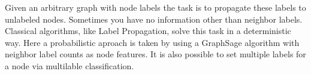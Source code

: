 Given an arbitrary graph with node labels the task is to propagate these labels to unlabeled nodes. Sometimes you have no information other than neighbor labels. Classical algorithms, like Label Propagation, solve this task in a deterministic way. Here a probabilistic aproach is taken by using a Graph\+Sage algorithm with neighbor label counts as node features. It is also possible to set multiple labels for a node via multilable classification. 